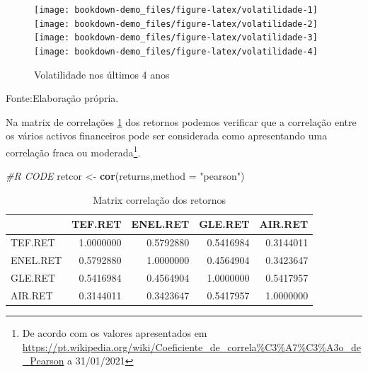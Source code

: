 \documentclass[
  12pt,
  a4paper,
  openany]{book}
\newenvironment{Shaded}{\begin{snugshade}}{\end{snugshade}}
\newcommand{\CommentTok}[1]{\textcolor[rgb]{0.56,0.35,0.01}{\textit{#1}}}
\newcommand{\DataTypeTok}[1]{\textcolor[rgb]{0.13,0.29,0.53}{#1}}
\newcommand{\KeywordTok}[1]{\textcolor[rgb]{0.13,0.29,0.53}{\textbf{#1}}}
\newcommand{\NormalTok}[1]{#1}
\newcommand{\StringTok}[1]{\textcolor[rgb]{0.31,0.60,0.02}{#1}}
\begin{document}
\normalsize

\begin{figure}

{\centering \texttt{[image: bookdown-demo\_files/figure-latex/volatilidade-1]} \texttt{[image: bookdown-demo\_files/figure-latex/volatilidade-2]} \texttt{[image: bookdown-demo\_files/figure-latex/volatilidade-3]} \texttt{[image: bookdown-demo\_files/figure-latex/volatilidade-4]} 

}

\caption{Volatilidade nos últimos 4 anos}\label{fig:volatilidade}
\end{figure}
\FloatBarrier
\centering

Fonte:Elaboração própria.

\justifying
\bigskip

Na matrix de correlações \ref{tab:correl} dos retornos podemos verificar que a correlação entre os vários activos financeiros pode ser considerada como apresentando uma correlação fraca ou moderada\footnote{De acordo com os valores apresentados em \url{https://pt.wikipedia.org/wiki/Coeficiente_de_correla\%C3\%A7\%C3\%A3o_de_Pearson} a 31/01/2021}.

\scriptsize

\begin{Shaded}
\begin{Highlighting}[]
\CommentTok{\#R CODE}
\NormalTok{retcor \textless{}{-}}\StringTok{ }\KeywordTok{cor}\NormalTok{(returns,}\DataTypeTok{method =} \StringTok{"pearson"}\NormalTok{)}
\end{Highlighting}
\end{Shaded}

\normalsize

\begin{table}[!h]

\caption{\label{tab:correl}Matrix correlação dos retornos}
\centering
\begin{tabular}[t]{lrrrr}
\toprule
  & TEF.RET & ENEL.RET & GLE.RET & AIR.RET\\
\midrule
TEF.RET & 1.0000000 & 0.5792880 & 0.5416984 & 0.3144011\\
ENEL.RET & 0.5792880 & 1.0000000 & 0.4564904 & 0.3423647\\
GLE.RET & 0.5416984 & 0.4564904 & 1.0000000 & 0.5417957\\
AIR.RET & 0.3144011 & 0.3423647 & 0.5417957 & 1.0000000\\
\bottomrule
\end{tabular}
\end{table}
\FloatBarrier
\centering
\end{document}
